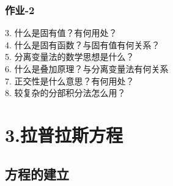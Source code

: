 \begin{frame}
	\frametitle{作业-2}
	3. 什么是固有值？有何用处？
	\\
	4. 什么是固有函数？与固有值有何关系？ 
	\\
	5. 分离变量法的数学思想是什么？
	\\
	6. 什么是叠加原理？与分离变量法有何关系
	\\
	7. 正交性是什么意思？有何用处？
	\\
	8. 较复杂的分部积分法怎么用？	
\end{frame}	


\section{3.拉普拉斯方程}
\subsection{方程的建立}
